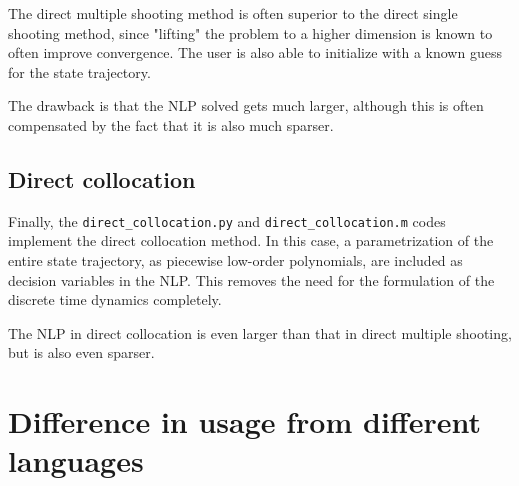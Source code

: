 \documentclass[a4paper,12pt]{book}
\begin{document}
The direct multiple shooting method is often superior to the direct single
shooting method, since "lifting" the problem to a higher dimension is known
to often improve convergence. The user is also able to initialize with
a known guess for the state trajectory.

The drawback is that the NLP solved gets much larger, although this is often
compensated by the fact that it is also much sparser.

\section{Direct collocation}
Finally, the \verb|direct_collocation.py| and \verb|direct_collocation.m|
codes implement the direct collocation method. In this case, a parametrization
of the entire state trajectory, as piecewise low-order polynomials, are included
as decision variables in the NLP. This removes the need for the formulation
of the discrete time dynamics completely.

The NLP in direct collocation is even larger than that in direct multiple shooting,
but is also even sparser.

\chapter{Difference in usage from different languages} \label{ch:syntax_differences}
\end{document}
